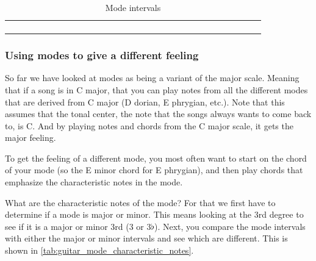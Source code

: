 \begin{table}[h]
\begin{NiceTabular}{*{30}{c}}
		\hline \\
		 &  & & & & & & & & & & & & &  & &  & &  & &  & &  & &  & &  & & \\
		\Block{}{} &  & & & & & & & & & & & &  & &  & &  & &  & &  & &  & &  & & \\
		\Block{}{} &  & & & & & & & & & & & &   & &  & &  & &  & &  & &  & &  & & \\
	\end{NiceTabular}
	\caption{Mode intervals}
	\label{tab:guitar_mode_intervals}
\end{table}

\newpage

\subsubsection{Using modes to give a different feeling}

So far we have looked at modes as being a variant of the major scale. Meaning that if a song is in C major, that you can play notes from all the different modes that are derived from C major (D dorian, E phrygian, etc.). Note that this assumes that the tonal center, the note that the songs always wants to come back to, is C. And by playing notes and chords from the C major scale, it gets the major feeling.

To get the feeling of a different mode, you most often want to start on the chord of your mode (so the E minor chord for E phrygian), and then play chords that emphasize the characteristic notes in the mode.

What are the characteristic notes of the mode? For that we first have to determine if a mode is major or minor. This means looking at the 3rd degree to see if it is a major or minor 3rd (3 or 3$\flat$). Next, you compare the mode intervals with either the major or minor intervals and see which are different. This is shown in \autoref{tab:guitar_mode_characteristic_notes}.


